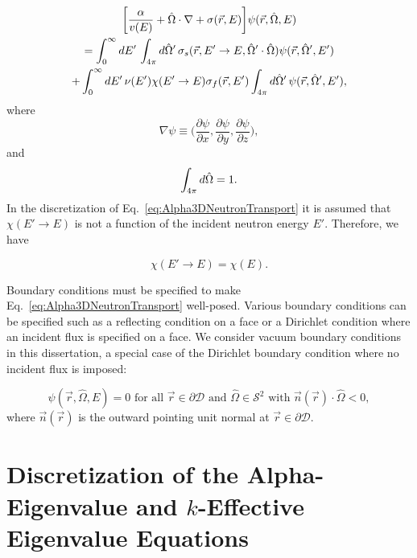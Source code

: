 \begin{multline}
	\bigg [ \frac{\alpha}{v(E)} + \hat{\Omega} \cdot \nabla + \sigma(\vec{r},E) \bigg ] \psi(\vec{r},\hat{\Omega},E) \\ = \int_{0}^{\infty} \mathop{}\!d E' \, \int_{4\pi} \mathop{}\!d \hat{\Omega}' \, \sigma_{s}(\vec{r},E'\rightarrow E,\hat{\Omega}' \cdot \hat{\Omega}) \psi(\vec{r},\hat{\Omega}',E') \\ + \int_{0}^{\infty} \mathop{}\!d E' \, \nu(E') \chi(E'\rightarrow E) \sigma_{f}(\vec{r},E') \int_{4\pi} \mathop{}\!d \hat{\Omega}' \, \psi(\vec{r},\hat{\Omega}',E'), 
	\label{eq:Alpha3DNeutronTransport}
\end{multline}
where
\begin{equation}
	\nabla \psi \equiv \bigg (\frac{\partial \psi}{\partial x}, \frac{\partial \psi}{\partial y}, \frac{\partial \psi}{\partial z} \bigg ),
\end{equation}
and
\begin{equation}
	 \int_{4\pi} \mathop{}\!d \hat{\Omega} = 1.
\end{equation}
In the discretization of Eq.~\ref{eq:Alpha3DNeutronTransport} it is assumed that $\chi(E' \rightarrow E)$ is not a function of the incident neutron energy $E'$. Therefore, we have 

\begin{equation}
\chi(E' \rightarrow E) = \chi(E).
\end{equation}

Boundary conditions must be specified to make Eq.~\ref{eq:Alpha3DNeutronTransport} well-posed. Various boundary conditions can be specified such as a reflecting condition on a face or a Dirichlet condition where an incident flux is specified on a face. We consider vacuum boundary conditions in this dissertation, a special case of the Dirichlet boundary condition where no incident flux is imposed:

\begin{equation}
	\psi(\vec{r},\hat{\Omega},E) = 0 \text{ for all } \vec{r} \in \partial \mathcal{D} \text{ and } \hat{\Omega} \in \mathcal{S}^{2} \text{ with } \vec{n}(\vec{r}) \cdot \hat{\Omega} < 0,
\end{equation}
where $\vec{n}(\vec{r})$ is the outward pointing unit normal at $\vec{r} \in \partial \mathcal{D}$.

\section{Discretization of the Alpha-Eigenvalue and $k$-Effective Eigenvalue Equations}

